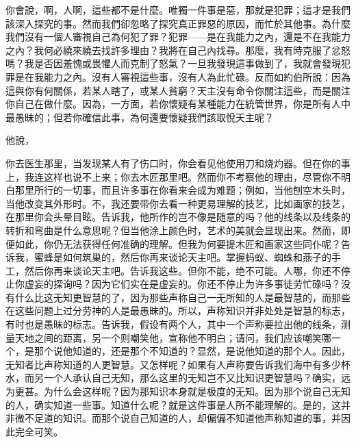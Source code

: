 你會說，啊，人啊，這些都不是什麼。唯獨一件事是惡，那就是犯罪；這才是我們該深入探究的事。然而我們卻忽略了探究真正罪惡的原因，而忙於其他事。為什麼我們沒有一個人審視自己為何犯了罪？犯罪——是在我能力之內，還是不在我能力之內？我何必繞來繞去找許多理由？我將在自己內找尋。那麼，我有時克服了忿怒嗎？我是否因羞愧或畏懼人而克制了怒氣？一旦我發現這事做到了，我就會發現犯罪是在我能力之內。沒有人審視這些事，沒有人為此忙碌。反而如約伯所說：因為這與你有何關係，若某人瞎了，或某人貧窮？天主沒有命令你關注這些，而是關注你自己在做什麼。因為，一方面，若你懷疑有某種能力在統管世界，你是所有人中最愚昧的；但若你確信此事，為何還要懷疑我們該取悅天主呢？\par

他說，\par

你去医生那里，当发现某人有了伤口时，你会看见他使用刀和烧灼器。但在你的事上，我连这样也说不上来；你去木匠那里吧。然而你不考察他的理由，尽管你不明白那里所行的一切事，而且许多事在你看来会成为难题；例如，当他刨空木头时，当他改变其外形时。不，我还要带你去看一种更易理解的技艺，比如画家的技艺，在那里你会头晕目眩。告诉我，他所作的岂不像是随意的吗？他的线条以及线条的转折和弯曲是什么意思呢？但当他涂上颜色时，艺术的美就会显现出来。然而，即便如此，你仍无法获得任何准确的理解。但我为何要提木匠和画家这些同仆呢？告诉我，蜜蜂是如何筑巢的，然后你再来谈论天主吧。掌握蚂蚁、蜘蛛和燕子的手工，然后你再来谈论天主吧。告诉我这些。但你不能，绝不可能。人哪，你还不停止你虚妄的探询吗？因为它们实在是虚妄的。你还不停止为许多事徒劳忙碌吗？没有什么比这无知更智慧的了，因为那些声称自己一无所知的人是最智慧的，而那些在这些问题上过分劳神的人是最愚昧的。所以，声称知识并非处处是智慧的标志，有时也是愚昧的标志。告诉我，假设有两个人，其中一个声称要拉出他的线条，测量天地之间的距离，另一个则嘲笑他，宣称他不明白；请问，我们应该嘲笑哪一个，是那个说他知道的，还是那个不知道的？显然，是说他知道的那个人。因此，无知者比声称知道的人更智慧。又怎样呢？如果有人声称要告诉我们海中有多少杯水，而另一个人承认自己无知，那么这里的无知岂不又比知识更智慧吗？确实，远为更甚。为什么会这样呢？因为那知识本身就是极度的无知。因为那个说自己无知的人，确实知道一些事。知道什么呢？就是这件事是人所不能理解的。是的，这并非微不足道的知识。而那个说自己知道的人，却偏偏不知道他声称知道的事，并因此完全可笑。\par

